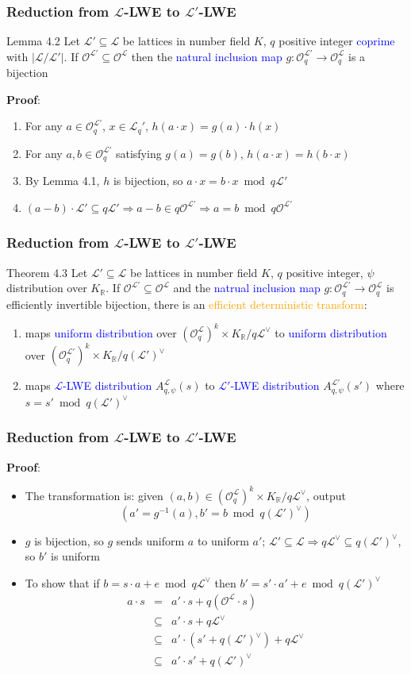 \documentclass{beamer}
\newcommand{\blue}[1]{\textcolor{blue}{#1}}
\newcommand{\dgreen}[1]{\textcolor{dgreen}{#1}}
\newcommand{\orange}[1]{\textcolor{orange}{#1}}
\newcommand{\cL}{\mathcal{L}}
\newcommand{\cO}{\mathcal{O}}
\newcommand{\cOL}{\mathcal{O}^{\mathcal{L}}}
\newcommand{\cOLp}{\mathcal{O}^{\mathcal{L'}}}
\newcommand{\cLV}{\mathcal{L}^{\vee}}
\newcommand{\cLpV}{(\mathcal{L'})^{\vee}}
\newcommand{\KR}{K_{\mathbb{R}}}
\begin{document}
\frame
{
  \frametitle{Reduction from $\cL$-LWE to $\cL'$-LWE}

  \begin{block}{Lemma 4.2}
  Let $\cL'\subseteq\cL$ be lattices in number field $K$, $q$ positive integer \blue{coprime} with $|\cL/\cL'|$.
  If $\cOLp\subseteq\cO^{\cL}$ then the \blue{natural inclusion map} $g:\cOLp_q\to\cOL_q$ is a \dgreen{bijection}
  \end{block}
  \textbf{Proof}:
  \begin{enumerate}
  	\item For any $a\in\cOLp_q$, $x\in\cL_q'$, $h(a\cdot x)=g(a)\cdot h(x)$
  	\item For any $a,b\in\cOLp_q$ satisfying $g(a)=g(b)$, $h(a\cdot x)=h(b\cdot x)$
  	\item By Lemma 4.1, $h$ is bijection, so $a\cdot x=b\cdot x\bmod q\cL'$
  	\item $(a-b)\cdot\cL'\subseteq q\cL'\Rightarrow a-b\in q\cOLp\Rightarrow a=b\bmod q\cOLp$
  \end{enumerate}
}

\frame
{
  \frametitle{Reduction from $\cL$-LWE to $\cL'$-LWE}
  \begin{block}{Theorem 4.3}
  Let $\cL'\subseteq\cL$ be lattices in number field $K$, $q$ positive integer, $\psi$ distribution over $\KR$.
  If $\cOLp\subseteq\cOL$ and the \blue{natrual inclusion map} $g:\cOLp_q\to\cOL_q$ is \dgreen{efficiently invertible bijection}, there is an \orange{efficient deterministic transform}:
  \begin{enumerate}
  	\item maps \blue{uniform distribution} over $(\cOL_q)^k\times\KR/q\cLV$ to \blue{uniform distribution} over $(\cOLp_q)^k\times\KR/q\cLpV$
  	\item maps \blue{$\cL$-LWE distribution} $A_{q,\psi}^{\cL}(s)$ to \blue{$\cL'$-LWE distribution} $A_{q,\psi}^{\cL'}(s')$ where $s=s'\bmod q\cLpV$
  \end{enumerate}
  \end{block}
}

\frame
{
  \frametitle{Reduction from $\cL$-LWE to $\cL'$-LWE}
  \textbf{Proof}:
  \begin{itemize}
  	\item The transformation is: given $(a,b)\in(\cOL_q)^k\times\KR/q\cLV$, output
  	\[(a'=g^{-1}(a),b'=b\bmod q\cLpV)\]
  	\item $g$ is bijection, so $g$ sends uniform $a$ to uniform $a'$; $\cL'\subseteq\cL\Rightarrow q\cLV\subseteq q\cLpV$, so $b'$ is uniform
  	\item To show that if $b=s\cdot a+e\bmod q\cLV$ then $b'=s'\cdot a'+e\bmod q\cLpV$
  	\begin{eqnarray*}
  		a\cdot s &=& a'\cdot s + q(\cOL\cdot s) \\
  		&\subseteq& a'\cdot s + q\cLV \\
  		&\subseteq& a'\cdot(s'+q\cLpV) + q\cLV \\
  		&\subseteq& a'\cdot s'+q\cLpV
  	\end{eqnarray*}

  \end{itemize}
}
\end{document}
